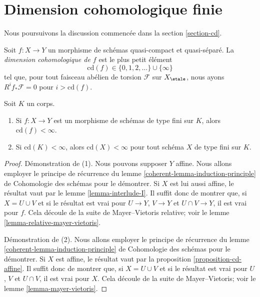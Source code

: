 \section{Dimension cohomologique finie}
\label{section-finite-cd}

\noindent
Nous poursuivons la discussion commencée dans la section \ref{section-cd}.

\begin{definition}
\label{definition-cd-f}
Soit $f : X \to Y$ un morphisme de schémas quasi-compact et
quasi-séparé.
La {\it dimension cohomologique de $f$} est le plus petit
élément
$$
\text{cd}(f) \in \{0, 1, 2, \ldots\} \cup \{\infty\}
$$
tel que, pour tout faisceau abélien de torsion $\mathcal{F}$
sur $X_\etale$, nous ayons $R^if_*\mathcal{F} = 0$
pour $i > \text{cd}(f)$.
\end{definition}

\begin{lemma}
\label{lemma-finite-cd}
Soit $K$ un corps.
\begin{enumerate}
\item Si $f : X \to Y$ est un morphisme de schémas de type fini sur $K$,
alors $\text{cd}(f) < \infty$.
\item Si $\text{cd}(K) < \infty$, alors $\text{cd}(X) < \infty$
pour tout schéma $X$ de type fini sur $K$.
\end{enumerate}
\end{lemma}

\begin{proof}
Démonstration de (1). Nous pouvons supposer $Y$ affine. Nous allons employer le
principe de récurrence du
lemme \ref{coherent-lemma-induction-principle} de Cohomologie des schémas
pour le démontrer. Si $X$ est lui aussi affine, le résultat vaut par le
lemme \ref{lemma-interlude-I}. Il suffit donc de montrer que, si
$X = U \cup V$ et si le résultat est vrai pour $U \to Y$, $V \to Y$ et
$U \cap V \to Y$, il est vrai pour $f$. Cela découle de la
suite de Mayer--Vietoris relative; voir le
lemme \ref{lemma-relative-mayer-vietoris}.

\medskip\noindent
Démonstration de (2). Nous allons employer le principe de récurrence du
lemme \ref{coherent-lemma-induction-principle} de Cohomologie des schémas
pour le démontrer. Si $X$ est affine, le résultat vaut par la
proposition \ref{proposition-cd-affine}. Il suffit donc de montrer que, si
$X = U \cup V$ et si le résultat est vrai pour $U$, $V$ et
$U \cap V $, il est vrai pour $X$. Cela découle de la
suite de Mayer--Vietoris; voir le
lemme \ref{lemma-mayer-vietoris}.
\end{proof}

